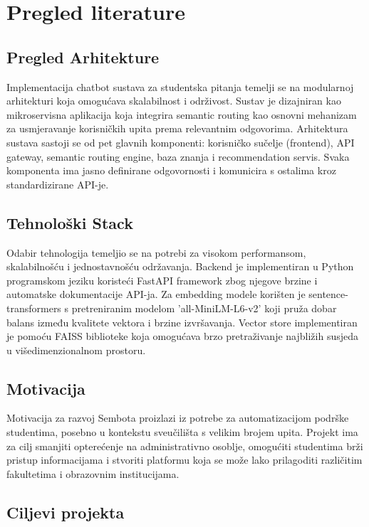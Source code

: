 \section{Pregled literature}

\subsection{Pregled Arhitekture}
Implementacija chatbot sustava za studentska pitanja temelji se na modularnoj arhitekturi koja omogućava skalabilnost i održivost. Sustav je dizajniran kao mikroservisna aplikacija koja integrira semantic routing kao osnovni mehanizam za usmjeravanje korisničkih upita prema relevantnim odgovorima.
Arhitektura sustava sastoji se od pet glavnih komponenti: korisničko sučelje (frontend), API gateway, semantic routing engine, baza znanja i recommendation servis. Svaka komponenta ima jasno definirane odgovornosti i komunicira s ostalima kroz standardizirane API-je.

\subsection{Tehnološki Stack}
Odabir tehnologija temeljio se na potrebi za visokom performansom, skalabilnošću i jednostavnošću održavanja. Backend je implementiran u Python programskom jeziku koristeći FastAPI framework zbog njegove brzine i automatske dokumentacije API-ja.
Za embedding modele korišten je sentence-transformers s pretreniranim modelom 'all-MiniLM-L6-v2' koji pruža dobar balans između kvalitete vektora i brzine izvršavanja. Vector store implementiran je pomoću FAISS biblioteke koja omogućava brzo pretraživanje najbližih susjeda u višedimenzionalnom prostoru.

\subsection{Motivacija}

Motivacija za razvoj Sembota proizlazi iz potrebe za automatizacijom podrške studentima, posebno u kontekstu sveučilišta s velikim brojem upita. Projekt ima za cilj smanjiti opterećenje na administrativno osoblje, omogućiti studentima brži pristup informacijama i stvoriti platformu koja se može lako prilagoditi različitim fakultetima i obrazovnim institucijama.

\subsection{Ciljevi projekta}

